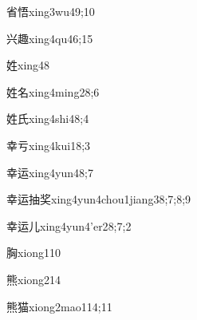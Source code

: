 \begin{verbete}{省悟}{xing3wu4}{9;10}
\end{verbete}

\begin{verbete}{兴趣}{xing4qu4}{6;15}
\end{verbete}

\begin{verbete}{姓}{xing4}{8}
\end{verbete}

\begin{verbete}{姓名}{xing4ming2}{8;6}
\end{verbete}

\begin{verbete}{姓氏}{xing4shi4}{8;4}
\end{verbete}

\begin{verbete}{幸亏}{xing4kui1}{8;3}
\end{verbete}

\begin{verbete}{幸运}{xing4yun4}{8;7}
\end{verbete}

\begin{verbete}{幸运抽奖}{xing4yun4chou1jiang3}{8;7;8;9}
\end{verbete}

\begin{verbete}{幸运儿}{xing4yun4'er2}{8;7;2}
\end{verbete}

\begin{verbete}{胸}{xiong1}{10}
\end{verbete}

\begin{verbete}{熊}{xiong2}{14}
\end{verbete}

\begin{verbete}{熊猫}{xiong2mao1}{14;11}
\end{verbete}

